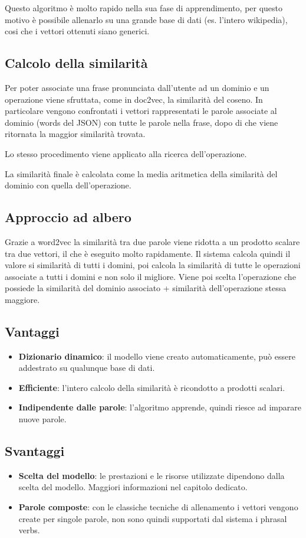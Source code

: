 \documentclass[twoside]{supsistudent}
\begin{document}
Questo algoritmo è molto rapido nella sua fase di apprendimento, per questo motivo è possibile allenarlo su una grande base di dati (es. l'intero wikipedia), cosi che i vettori ottenuti siano generici.\cite{word2vec}
\subsection{Calcolo della similarità}
Per poter associate una frase pronunciata dall'utente ad un dominio e un operazione viene sfruttata, come in doc2vec, la similarità del coseno. In particolare vengono confrontati i vettori rappresentati le parole associate al dominio (words del JSON) con tutte le parole nella frase, dopo di che viene ritornata la maggior similarità trovata. 

Lo stesso procedimento viene applicato alla ricerca dell'operazione. 

La similarità finale è calcolata come la media aritmetica della similarità del dominio con quella dell'operazione.
\subsection{Approccio ad albero}
Grazie a word2vec la similarità tra due parole viene ridotta a un prodotto scalare tra due vettori, il che è eseguito molto rapidamente. Il sistema calcola quindi il valore si similarità di tutti i domini, poi calcola la similarità di tutte le operazioni associate a tutti i domini e non solo il migliore. Viene poi scelta l'operazione che possiede la similarità del dominio associato + similarità dell'operazione stessa maggiore.
\subsection{Vantaggi}
\begin{itemize}
  \item \textbf{Dizionario dinamico}: il modello viene creato automaticamente, può essere addestrato su qualunque base di dati.
  \item \textbf{Efficiente}: l'intero calcolo della similarità è ricondotto a prodotti scalari.
    \item \textbf{Indipendente dalle parole}: l'algoritmo apprende, quindi riesce ad imparare nuove parole.
\end{itemize}
\subsection{Svantaggi}
\begin{itemize}
  \item \textbf{Scelta del modello}: le prestazioni e le risorse utilizzate dipendono dalla scelta del modello. Maggiori informazioni nel capitolo dedicato.
  \item \textbf{Parole composte}: con le classiche tecniche di allenamento i vettori vengono create per singole parole, non sono quindi supportati dal sistema i phrasal verbs.
\end{itemize}
\end{document}
